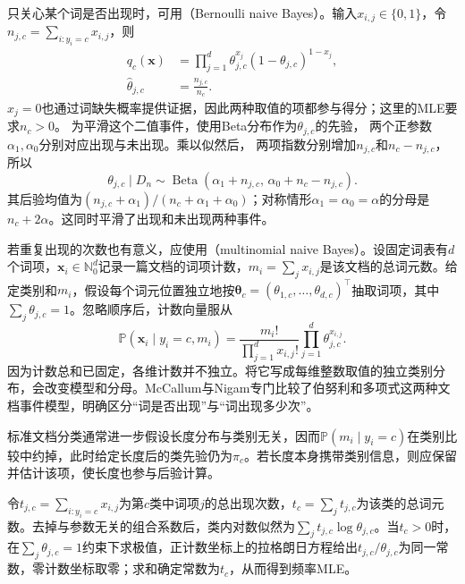 只关心某个词是否出现时，可用（Bernoulli naive Bayes）。输入$x_{i,j}\in\{0,1\}$，令$n_{j,c}=\sum_{i:y_i=c}x_{i,j}$，则
\begin{equation}
  \label{eq:classification-naive-bayes-bernoulli}
  \begin{aligned}
    q_c(\bm{x})
      &=\prod_{j=1}^{d}
        \theta_{j,c}^{x_j}(1-\theta_{j,c})^{1-x_j},\\
    \hat\theta_{j,c}&=\frac{n_{j,c}}{n_c}.
  \end{aligned}
\end{equation}
$x_j=0$也通过词缺失概率提供证据，因此两种取值的项都参与得分；这里的MLE要求$n_c>0$。
为平滑这个二值事件，使用Beta分布作为$\theta_{j,c}$的先验，
两个正参数$\alpha_1,\alpha_0$分别对应出现与未出现。乘以似然后，
两项指数分别增加$n_{j,c}$和$n_c-n_{j,c}$，所以
\[
  \theta_{j,c}\mid D_n
  \sim\operatorname{Beta}
    (\alpha_1+n_{j,c},\,\alpha_0+n_c-n_{j,c}).
\]
其后验均值为$(n_{j,c}+\alpha_1)/(n_c+\alpha_1+\alpha_0)$；对称情形$\alpha_1=\alpha_0=\alpha$的分母是$n_c+2\alpha$。这同时平滑了出现和未出现两种事件。

若重复出现的次数也有意义，应使用（multinomial naive Bayes）。设固定词表有$d$个词项，$\bm{x}_i\in\mathbb{N}_0^d$记录一篇文档的词项计数，$m_i=\sum_jx_{i,j}$是该文档的总词元数。给定类别和$m_i$，假设每个词元位置独立地按$\bm{\theta}_c=(\theta_{1,c},\ldots,\theta_{d,c})^{\top}$抽取词项，其中$\sum_j\theta_{j,c}=1$。忽略顺序后，计数向量服从
\begin{equation}
  \label{eq:classification-naive-bayes-multinomial}
  \mathbb{P}(\bm{x}_i\mid y_i=c,m_i)
  =\frac{m_i!}{\prod_{j=1}^{d}x_{i,j}!}
    \prod_{j=1}^{d}\theta_{j,c}^{x_{i,j}}.
\end{equation}
因为计数总和已固定，各维计数并不独立。将它写成每维整数取值的独立类别分布，会改变模型和分母。McCallum与Nigam专门比较了伯努利和多项式这两种文档事件模型，明确区分“词是否出现”与“词出现多少次”。

标准文档分类通常进一步假设长度分布与类别无关，因而$\mathbb{P}(m_i\mid y_i=c)$在类别比较中约掉，此时给定长度后的类先验仍为$\pi_c$。若长度本身携带类别信息，则应保留并估计该项，使长度也参与后验计算。

令$t_{j,c}=\sum_{i:y_i=c}x_{i,j}$为第$c$类中词项$j$的总出现次数，$t_c=\sum_jt_{j,c}$为该类的总词元数。去掉与参数无关的组合系数后，类内对数似然为$\sum_jt_{j,c}\log\theta_{j,c}$。当$t_c>0$时，在$\sum_j\theta_{j,c}=1$约束下求极值，正计数坐标上的拉格朗日方程给出$t_{j,c}/\theta_{j,c}$为同一常数，零计数坐标取零；求和确定常数为$t_c$，从而得到频率MLE。

